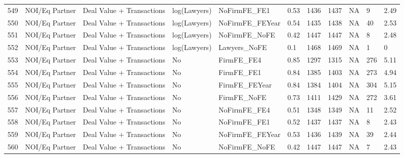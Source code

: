 \documentclass{article}
\begin{document}
\begin{table}[H]
\begin{tabular}{rllllllllll}
  549 & NOI/Eq Partner & Deal Value + Transactions & log(Lawyers) & NoFirmFE\_FE1 & 0.53 & 1436 & 1437 & NA & 9 & 2.49 \\
  550 & NOI/Eq Partner & Deal Value + Transactions & log(Lawyers) & NoFirmFE\_FEYear & 0.54 & 1435 & 1438 & NA & 40 & 2.53 \\
  551 & NOI/Eq Partner & Deal Value + Transactions & log(Lawyers) & NoFirmFE\_NoFE & 0.42 & 1447 & 1447 & NA & 8 & 2.48 \\
  552 & NOI/Eq Partner & Deal Value + Transactions & log(Lawyers) & Lawyers\_NoFE & 0.1 & 1468 & 1469 & NA & 1 & 0 \\
  553 & NOI/Eq Partner & Deal Value + Transactions & No & FirmFE\_FE4 & 0.85 & 1297 & 1315 & NA & 276 & 5.11 \\
  554 & NOI/Eq Partner & Deal Value + Transactions & No & FirmFE\_FE1 & 0.84 & 1385 & 1403 & NA & 273 & 4.94 \\
  555 & NOI/Eq Partner & Deal Value + Transactions & No & FirmFE\_FEYear & 0.84 & 1384 & 1404 & NA & 304 & 5.15 \\
  556 & NOI/Eq Partner & Deal Value + Transactions & No & FirmFE\_NoFE & 0.73 & 1411 & 1429 & NA & 272 & 3.61 \\
  557 & NOI/Eq Partner & Deal Value + Transactions & No & NoFirmFE\_FE4 & 0.51 & 1348 & 1349 & NA & 11 & 2.52 \\
  558 & NOI/Eq Partner & Deal Value + Transactions & No & NoFirmFE\_FE1 & 0.52 & 1437 & 1437 & NA & 8 & 2.43 \\
  559 & NOI/Eq Partner & Deal Value + Transactions & No & NoFirmFE\_FEYear & 0.53 & 1436 & 1439 & NA & 39 & 2.44 \\
  560 & NOI/Eq Partner & Deal Value + Transactions & No & NoFirmFE\_NoFE & 0.42 & 1447 & 1447 & NA & 7 & 2.43 \\
   \hline
\end{tabular}
\end{table}
\end{document}
